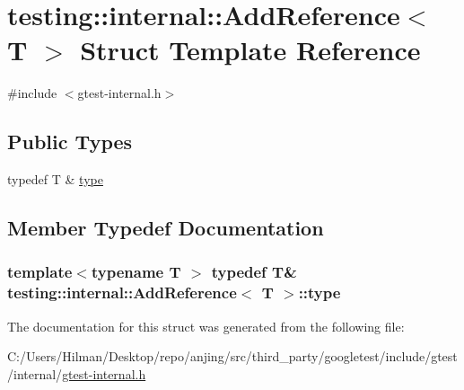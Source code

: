 \hypertarget{structtesting_1_1internal_1_1_add_reference}{}\section{testing\+:\+:internal\+:\+:Add\+Reference$<$ T $>$ Struct Template Reference}
\label{structtesting_1_1internal_1_1_add_reference}


{\ttfamily \#include $<$gtest-\/internal.\+h$>$}

\subsection*{Public Types}
\begin{DoxyCompactItemize}
\item 
typedef T \& \hyperlink{structtesting_1_1internal_1_1_add_reference_a2df8dd7c4e41f6390e6e66b1a9a67bb4}{type}
\end{DoxyCompactItemize}


\subsection{Member Typedef Documentation}
\hypertarget{structtesting_1_1internal_1_1_add_reference_a2df8dd7c4e41f6390e6e66b1a9a67bb4}{}
\subsubsection[{type}]{\setlength{\rightskip}{0pt plus 5cm}template$<$typename T $>$ typedef T\& {\bf testing\+::internal\+::\+Add\+Reference}$<$ T $>$\+::{\bf type}}\label{structtesting_1_1internal_1_1_add_reference_a2df8dd7c4e41f6390e6e66b1a9a67bb4}


The documentation for this struct was generated from the following file\+:\begin{DoxyCompactItemize}
\item 
C\+:/\+Users/\+Hilman/\+Desktop/repo/anjing/src/third\+\_\+party/googletest/include/gtest/internal/\hyperlink{gtest-internal_8h}{gtest-\/internal.\+h}\end{DoxyCompactItemize}
